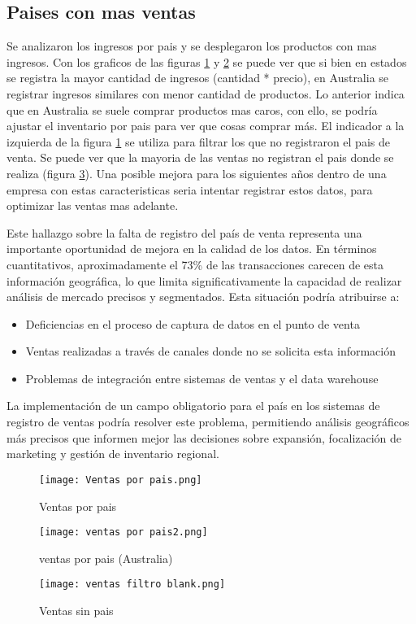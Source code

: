 \documentclass{article}
\begin{document}
\subsection{Paises con mas ventas}
Se analizaron los ingresos por pais y se desplegaron los productos con mas ingresos. Con los graficos de las figuras \ref{fig:ventas-por-pais} y \ref{fig:ventas-por-pais-2} se puede ver que si bien en estados se registra la mayor cantidad de ingresos (cantidad * precio), en Australia se registrar ingresos similares con menor cantidad de productos.
Lo anterior indica que en Australia se suele comprar productos mas caros, con ello, se podría ajustar el inventario por pais para ver que cosas comprar más.
El indicador a la izquierda de la figura \ref{fig:ventas-por-pais} se utiliza para filtrar los que no registraron el pais de venta. Se puede ver que la mayoria de las ventas no registran el pais donde se realiza (figura \ref{fig:ventas-sin-pais}). Una posible mejora para los siguientes años dentro de una empresa con estas caracteristicas seria intentar registrar estos datos, para optimizar las ventas mas adelante.

Este hallazgo sobre la falta de registro del país de venta representa una importante oportunidad de mejora en la calidad de los datos. En términos cuantitativos, aproximadamente el 73\% de las transacciones carecen de esta información geográfica, lo que limita significativamente la capacidad de realizar análisis de mercado precisos y segmentados. Esta situación podría atribuirse a:

\begin{itemize}
    \item Deficiencias en el proceso de captura de datos en el punto de venta
    \item Ventas realizadas a través de canales donde no se solicita esta información
    \item Problemas de integración entre sistemas de ventas y el data warehouse
\end{itemize}

La implementación de un campo obligatorio para el país en los sistemas de registro de ventas podría resolver este problema, permitiendo análisis geográficos más precisos que informen mejor las decisiones sobre expansión, focalización de marketing y gestión de inventario regional.

\begin{figure}
    \centering
    \texttt{[image: Ventas por pais.png]}
    \caption{Ventas por pais}
    \label{fig:ventas-por-pais}
\end{figure}
\begin{figure}
    \centering
    \texttt{[image: ventas por pais2.png]}
    \caption{ventas por pais (Australia)}
    \label{fig:ventas-por-pais-2}
\end{figure}
\begin{figure}
    \centering
    \texttt{[image: ventas filtro blank.png]}
    \caption{Ventas sin pais}
    \label{fig:ventas-sin-pais}
\end{figure}
\end{document}
